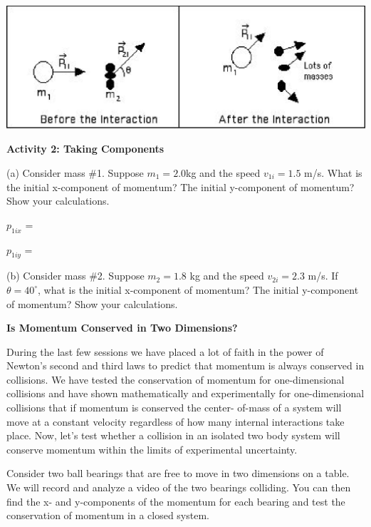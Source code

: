 \vspace{0.3cm}
{\par\centering \includegraphics{twod_collisions_fig3.eps} \par}
\vspace{0.3cm}

\textbf{Activity 2: Taking Components }

(a) Consider mass \#1. Suppose \( m_{1}  = 2.0 \)kg and the speed \( v_{1i} 
= 1.5 \) m/s. What is the initial x-component of momentum? The initial y-component
of momentum? Show your calculations.
\vspace{5mm}

\( p_{1ix} \) = 
\vspace{5mm}

\( p_{1iy} \) = 
\vspace{5mm}

(b) Consider mass \#2. Suppose \( m_{2}  = 1.8 \) kg and the speed 
\( v_{2i} 
= 2.3 \) m/s. If \( \theta   = 40^{\circ } \), what is the initial x-component
of momentum? The initial y-component of momentum? Show your calculations.
\vspace{20mm}

\textbf{Is Momentum Conserved in Two Dimensions? }

During the last few sessions we have placed a lot of faith in the power of Newton's
second and third laws to predict that momentum is always conserved in collisions.
We have tested the conservation of momentum for one-dimensional collisions and
have shown mathematically and experimentally for one-dimensional collisions
that if momentum is conserved the center- of-mass of a system will move at a
constant velocity regardless of how many internal interactions take place. Now,
let's test whether a collision in an isolated two body system will conserve
momentum within the limits of experimental uncertainty. 

Consider two ball bearings that are free to move in two dimensions on a table.
We will record and analyze a video of the two bearings colliding. You can then
find the x- and y-components of the momentum for each bearing and test the conservation
of momentum in a closed system. 

